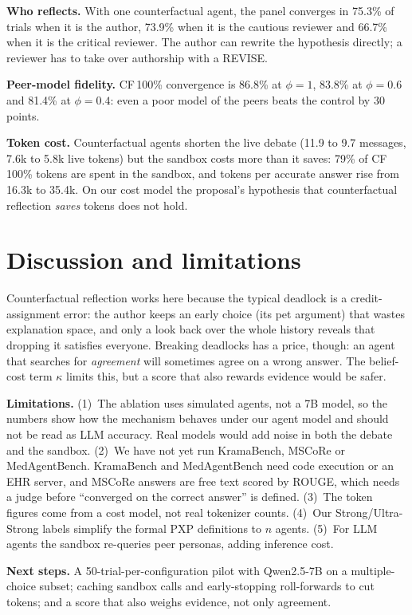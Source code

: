\documentclass[11pt,a4paper,twocolumn]{article}
\begin{document}
\textbf{Who reflects.} With one counterfactual agent, the panel converges in 75.3\% of
trials when it is the author, 73.9\% when it is the cautious reviewer and 66.7\% when it
is the critical reviewer. The author can rewrite the hypothesis directly; a reviewer has
to take over authorship with a REVISE.

\textbf{Peer-model fidelity.} CF\,100\% convergence is 86.8\% at $\phi=1$, 83.8\% at
$\phi=0.6$ and 81.4\% at $\phi=0.4$: even a poor model of the peers beats the control by
30 points.

\textbf{Token cost.} Counterfactual agents shorten the live debate (11.9 to 9.7 messages,
7.6k to 5.8k live tokens) but the sandbox costs more than it saves: 79\% of CF\,100\%
tokens are spent in the sandbox, and tokens per accurate answer rise from 16.3k to
35.4k. On our cost model the proposal's hypothesis that counterfactual reflection
\emph{saves} tokens does not hold.

\section{Discussion and limitations}
Counterfactual reflection works here because the typical deadlock is a credit-assignment
error: the author keeps an early choice (its pet argument) that wastes explanation space,
and only a look back over the whole history reveals that dropping it satisfies everyone. Breaking deadlocks has a price, though:
an agent that searches for \emph{agreement} will sometimes agree on a wrong answer. The
belief-cost term $\kappa$ limits this, but a score that also rewards evidence would be
safer.

\textbf{Limitations.} (1)~The ablation uses simulated agents, not a 7B model, so the
numbers show how the mechanism behaves under our agent model and should not be read as
LLM accuracy. Real models would add noise in both the debate and the sandbox.
(2)~We have not yet run KramaBench, MSCoRe or MedAgentBench. KramaBench and MedAgentBench
need code execution or an EHR server, and MSCoRe answers are free text scored by ROUGE,
which needs a judge before ``converged on the correct answer'' is defined.
(3)~The token figures come from a cost model, not real tokenizer counts.
(4)~Our Strong/Ultra-Strong labels simplify the formal PXP definitions to $n$ agents.
(5)~For LLM agents the sandbox re-queries peer personas, adding inference cost.

\textbf{Next steps.} A 50-trial-per-configuration pilot with Qwen2.5-7B on a
multiple-choice subset; caching sandbox calls and early-stopping roll-forwards to cut
tokens; and a score that also weighs evidence, not only agreement.
\end{document}
